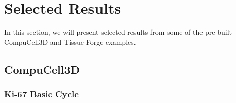

\newpage
\section{Selected Results}\label{sec:res}

In this section, we will present selected results from some of the pre-built CompuCell3D and Tissue Forge examples.

\subsection{CompuCell3D}\label{sec:res:cc3d}

\subsubsection{Ki-67 Basic Cycle}\label{sec:res:cc3d:division}

